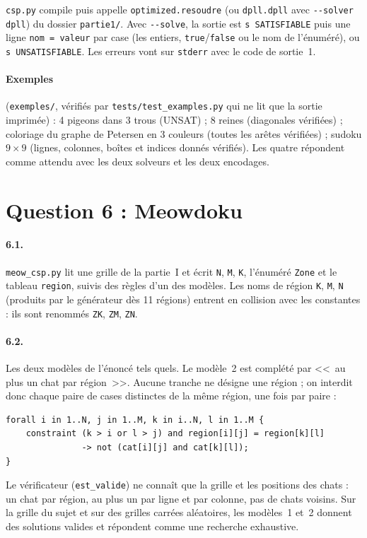\documentclass[11pt,a4paper]{article}
\newcommand{\f}[1]{\texttt{#1}}
\begin{document}
\f{csp.py} compile puis appelle \f{optimized.resoudre} (ou \f{dpll.dpll} avec \f{-{}-solver dpll}) du dossier \f{partie1/}. Avec \f{-{}-solve}, la sortie est \f{s SATISFIABLE} puis une ligne \f{nom = valeur} par case (les entiers, \f{true}/\f{false} ou le nom de l'énuméré), ou \f{s UNSATISFIABLE}. Les erreurs vont sur \f{stderr} avec le code de sortie~1.

\paragraph{Exemples} (\f{exemples/}, vérifiés par \f{tests/test\_examples.py} qui ne lit que la sortie imprimée) : 4 pigeons dans 3 trous (UNSAT) ; 8 reines (diagonales vérifiées) ; coloriage du graphe de Petersen en 3 couleurs (toutes les arêtes vérifiées) ; sudoku $9\times 9$ (lignes, colonnes, boîtes et indices donnés vérifiés). Les quatre répondent comme attendu avec les deux solveurs et les deux encodages.

\section*{Question 6 : Meowdoku}

\paragraph{6.1.} \f{meow\_csp.py} lit une grille de la partie~I et écrit \f{N}, \f{M}, \f{K}, l'énuméré \f{Zone} et le tableau \f{region}, suivis des règles d'un des modèles. Les noms de région \f{K}, \f{M}, \f{N} (produits par le générateur dès 11 régions) entrent en collision avec les constantes : ils sont renommés \f{ZK}, \f{ZM}, \f{ZN}.

\paragraph{6.2.} Les deux modèles de l'énoncé tels quels. Le modèle~2 est complété par <<~au plus un chat par région~>>. Aucune tranche ne désigne une région ; on interdit donc chaque paire de cases distinctes de la même région, une fois par paire :
\begin{verbatim}
forall i in 1..N, j in 1..M, k in i..N, l in 1..M {
    constraint (k > i or l > j) and region[i][j] = region[k][l]
               -> not (cat[i][j] and cat[k][l]);
}
\end{verbatim}
Le vérificateur (\f{est\_valide}) ne connaît que la grille et les positions des chats : un chat par région, au plus un par ligne et par colonne, pas de chats voisins. Sur la grille du sujet et sur des grilles carrées aléatoires, les modèles~1 et~2 donnent des solutions valides et répondent comme une recherche exhaustive.
\end{document}
